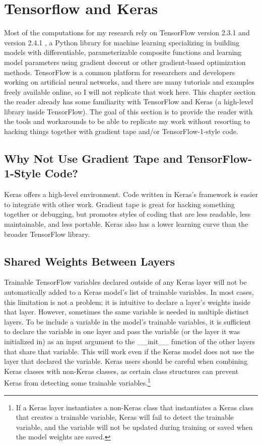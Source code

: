 \section{Tensorflow and Keras}
Most of the computations for my research rely on TensorFlow version 2.3.1 and version 2.4.1 \cite{tensorflow}, a Python library for machine learning specializing in building models with differentiable, parameterizable composite functions and learning model parameters using gradient descent or other gradient-based optimization methods. TensorFlow is a common platform for researchers and developers working on artificial neural networks, and there are many tutorials and examples freely available online, so I will not replicate that work here. This chapter section the reader already has some familiarity with TensorFlow and Keras \cite{keras} (a high-level library inside TensorFlow). The goal of this section is to provide the reader with the tools and workarounds to be able to replicate my work without resorting to hacking things together with gradient tape and/or TensorFlow-1-style code.

\subsection{Why Not Use Gradient Tape and TensorFlow-1-Style Code?}
Keras offers a high-level environment. Code written in Keras's framework is easier to integrate with other work. Gradient tape is great for hacking something together or debugging, but promotes styles of coding that are less readable, less maintainable, and less portable. Keras also has a lower learning curve than the broader TensorFlow library.


\subsection{Shared Weights Between Layers}
Trainable TensorFlow variables declared outside of any Keras layer will not be automatically added to a Keras model's list of trainable variables. In most cases, this limitation is not a problem; it is intuitive to declare a layer's weights inside that layer. However, sometimes the same variable is needed in multiple distinct layers. To be include a variable in the model's trainable variables, it is sufficient to declare the variable in one layer and pass the variable (or the layer it was initialized in) as an input argument to the \_\_init\_\_ function of the other layers that share that variable. This will work even if the Keras model does not use the layer that declared the variable. Keras users should be careful when combining Keras classes with non-Keras classes, as certain class structures can prevent Keras from detecting some trainable variables.\footnote{If a Keras layer instantiates a non-Keras class that instantiates a Keras class that creates a trainable variable, Keras will fail to detect the trainable variable, and the variable will not be updated during training or saved when the model weights are saved.}

